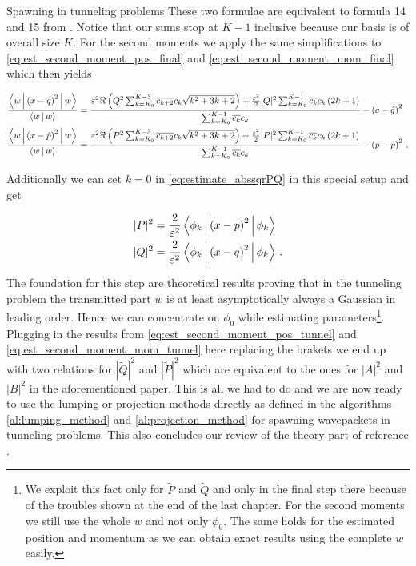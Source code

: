 \begin{chapter}{Spawning in tunneling problems}
These two formulae are equivalent to formula 14 and 15 from \cite{GHJ_tunneling_spawning}.
Notice that our sums stop at $K-1$ inclusive because our basis is of overall size $K$.
For the second moments we apply the same simplifications to \eqref{eq:est_second_moment_pos_final}
and \eqref{eq:est_second_moment_mom_final} which then yields

\begin{align} \label{eq:est_second_moment_pos_tunnel}
  \frac{\Braket{w|\left(x-\tilde{q}\right)^2|w}}{\Braket{w|w}} & =
  \frac{
    \varepsilon^2 \Re \left( Q^2 \sum_{k=K_0}^{K-3} \overline{c_{k+2}} c_{k} \sqrt{k^2+3k+2} \right)
    + \frac{\varepsilon^2}{2} |Q|^2 \sum_{k=K_0}^{K-1} \overline{c_k} c_k \left(2k+1\right)
  }{\sum_{k=K_0}^{K-1} \overline{c_k} c_k}
  - \left(q - \tilde{q}\right)^2 \\
  \label{eq:est_second_moment_mom_tunnel}
  \frac{\Braket{w|\left(x-\tilde{p}\right)^2|w}}{\Braket{w|w}} & =
  \frac{
    \varepsilon^2 \Re \left( P^2 \sum_{k=K_0}^{K-3} \overline{c_{k+2}} c_{k} \sqrt{k^2+3k+2} \right)
    + \frac{\varepsilon^2}{2} |P|^2 \sum_{k=K_0}^{K-1} \overline{c_k} c_k \left(2k+1\right)
  }{\sum_{k=K_0}^{K-1} \overline{c_k} c_k}
  - \left(p - \tilde{p}\right)^2 \,.
\end{align}

Additionally we can set $k=0$ in \eqref{eq:estimate_abssqrPQ} in this special setup
and get

\begin{equation}
\label{eq:estimate_abssqrPQ_tunnel}
\begin{split}
  |P|^2 & = \frac{2}{\varepsilon^2} \Braket{\phi_k | \left(x-p\right)^2 | \phi_k} \\
  |Q|^2 & = \frac{2}{\varepsilon^2} \Braket{\phi_k | \left(x-q\right)^2 | \phi_k} \,.
\end{split}
\end{equation}

The foundation for this step are theoretical results \cite{GHJ_exponentially_accurate}
proving that in the tunneling problem the transmitted part $w$ is at least
asymptotically always a Gaussian in leading order. Hence we can concentrate on
$\phi_0$ while estimating parameters\footnote{We exploit this fact only for $\tilde{P}$
and $\tilde{Q}$ and only in the final step there because of the troubles shown at the
end of the last chapter. For the second moments we still use the whole $w$ and
not only $\phi_0$. The same holds for the estimated position and momentum as we
can obtain exact results using the complete $w$ easily.}.
Plugging in the results from \eqref{eq:est_second_moment_pos_tunnel} and
\eqref{eq:est_second_moment_mom_tunnel} here replacing the brakets we end up with
two relations for $|\tilde{Q}|^2$ and $|\tilde{P}|^2$ which are equivalent to the
ones for $|A|^2$ and $|B|^2$ in the aforementioned paper. This is all we had to do
and we are now ready to use the lumping or projection methods directly as defined
in the algorithms \ref{al:lumping_method} and \ref{al:projection_method} for
spawning wavepackets in tunneling problems. This also concludes our review of the
theory part of reference \cite{GHJ_tunneling_spawning}.



\end{chapter}
